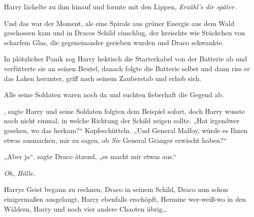 Harry lächelte zu ihm hinauf und formte mit den Lippen, \emph{Erzähl’s dir später.}

Und das war der Moment, als eine Spirale aus grüner Energie aus dem Wald geschossen kam und in Dracos Schild einschlug, der kreischte wie Stückchen von scharfem Glas, die gegeneinander gerieben wurden und Draco schwankte.

In plötzlicher Panik zog Harry hektisch die Starterkabel von der Batterie ab und verfütterte sie an seinen Beutel, danach folgte die Batterie selbst und dann riss er das Laken herunter, griff nach seinem Zauberstab und erhob sich.

Alle seine Soldaten waren noch da und suchten fieberhaft die Gegend ab.

, sagte Harry und seine Soldaten folgten dem Beispiel sofort, doch Harry wusste noch nicht einmal, in welche Richtung der Schild zeigen sollte.
„Hat irgendwer gesehen, wo das herkam?“ Kopfeschütteln.
„Und General Malfoy, würde es Ihnen etwas ausmachen, mir zu sagen, ob \emph{Sie} General Granger erwischt haben?“

„Aber ja“, sagte Draco ätzend, „es macht mir etwas aus.“

\emph{Oh, Hölle.}

Harrys Geist begann zu rechnen, Draco in seinem Schild, Draco nun schon einigermaßen ausgelaugt, Harry ebenfalls erschöpft, Hermine wer-weiß-wo in den Wäldern, Harry und noch vier andere Chaoten übrig…

